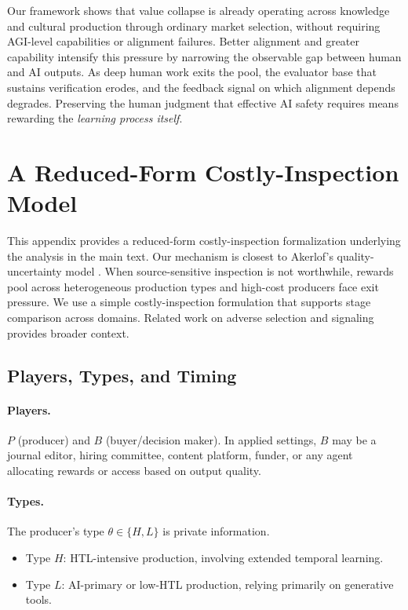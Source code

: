 \documentclass{article}
\theoremstyle{plain}
\theoremstyle{definition}
\theoremstyle{remark}
\begin{document}
Our framework shows that value collapse is already operating across knowledge and cultural production through ordinary market selection, without requiring AGI-level capabilities or alignment failures. Better alignment and greater capability intensify this pressure by narrowing the observable gap between human and AI outputs. As deep human work exits the pool, the evaluator base that sustains verification erodes, and the feedback signal on which alignment depends degrades. Preserving the human judgment that effective AI safety requires means rewarding the \emph{learning process itself}.





\newpage
\appendix
\onecolumn

\section{A Reduced-Form Costly-Inspection Model}
\label{app:model}

This appendix provides a reduced-form costly-inspection formalization underlying the analysis in the main text. Our mechanism is closest to Akerlof's quality-uncertainty model \citep{akerlof1970lemons}. When source-sensitive inspection is not worthwhile, rewards pool across heterogeneous production types and high-cost producers face exit pressure. We use a simple costly-inspection formulation that supports stage comparison across domains. Related work on adverse selection \citep{rothschild-stiglitz-1976-equilibrium} and signaling \citep{spence1973signaling} provides broader context.

\subsection{Players, Types, and Timing}
\label{app:setup}

\paragraph{Players.}
$P$ (producer) and $B$ (buyer/decision maker). In applied settings, $B$ may be a journal editor, hiring committee, content platform, funder, or any agent allocating rewards or access based on output quality.

\paragraph{Types.}
The producer's type $\theta\in\{H,L\}$ is private information.
\begin{itemize}
\item Type $H$: HTL-intensive production, involving extended temporal learning.
\item Type $L$: AI-primary or low-HTL production, relying primarily on generative tools.
\end{itemize}
\end{document}
